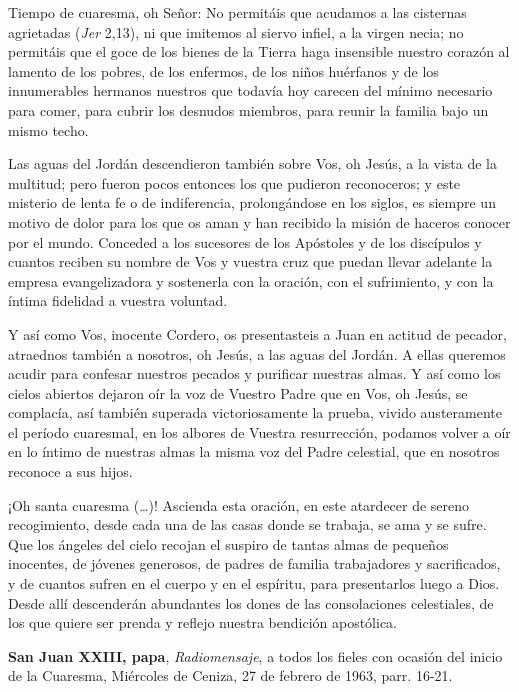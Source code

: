 \begin{patercite}
[\ldots] Tiempo de cuaresma, oh Señor: No permitáis que acudamos a las cisternas agrietadas (\textit{Jer} 2,13), ni que imitemos al siervo infiel, a la virgen necia; no permitáis que el goce de los bienes de la Tierra haga insensible nuestro corazón al lamento de los pobres, de los enfermos, de los niños huérfanos y de los innumerables hermanos nuestros que todavía hoy carecen del mínimo necesario para comer, para cubrir los desnudos miembros, para reunir la familia bajo un mismo techo.	

Las aguas del Jordán descendieron también sobre Vos, oh Jesús, a la vista de la multitud; pero fueron pocos entonces los que pudieron reconoceros; y este misterio de lenta fe o de indiferencia, prolongándose en los siglos, es siempre un motivo de dolor para los que os aman y han recibido la misión de haceros conocer por el mundo. Conceded a los sucesores de los Apóstoles y de los discípulos y cuantos reciben su nombre de Vos y vuestra cruz que puedan llevar adelante la empresa evangelizadora y sostenerla con la oración, con el sufrimiento, y con la íntima fidelidad a vuestra voluntad.

Y así como Vos, inocente Cordero, os presentasteis a Juan en actitud de pecador, atraednos también a nosotros, oh Jesús, a las aguas del Jordán. A ellas queremos acudir para confesar nuestros pecados y purificar nuestras almas. Y así como los cielos abiertos dejaron oír la voz de Vuestro Padre que en Vos, oh Jesús, se complacía, así también superada victoriosamente la prueba, vivido austeramente el período cuaresmal, en los albores de Vuestra resurrección, podamos volver a oír en lo íntimo de nuestras almas la misma voz del Padre celestial, que en nosotros reconoce a sus hijos.

¡Oh santa cuaresma (\ldots)! Ascienda esta oración, en este atardecer de sereno recogimiento, desde cada una de las casas donde se trabaja, se ama y se sufre. Que los ángeles del cielo recojan el suspiro de tantas almas de pequeños inocentes, de jóvenes generosos, de padres de familia trabajadores y sacrificados, y de cuantos sufren en el cuerpo y en el espíritu, para presentarlos luego a Dios. Desde allí descenderán abundantes los dones de las consolaciones celestiales, de los que quiere ser prenda y reflejo nuestra bendición apostólica.

\textbf{San Juan XXIII, papa}, \textit{Radiomensaje}, a todos los fieles con ocasión del inicio de la Cuaresma,  Miércoles de Ceniza, 27 de febrero de 1963, parr. 16-21.
\end{patercite}
